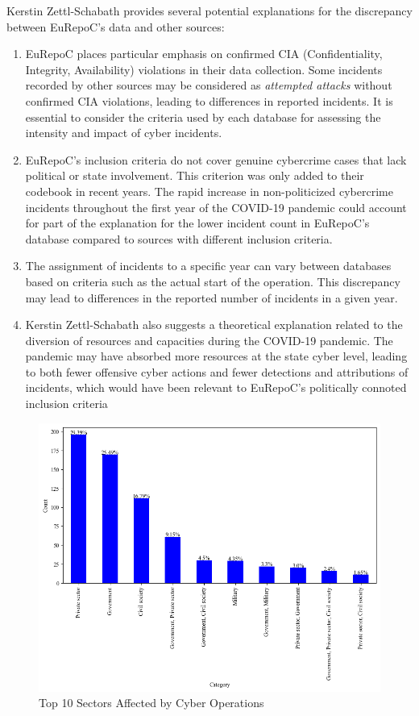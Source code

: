 Kerstin Zettl-Schabath provides several potential explanations for the discrepancy between EuRepoC's data and other sources:
\begin{enumerate}
    \item EuRepoC places particular emphasis on confirmed CIA (Confidentiality, Integrity, Availability) violations in their data collection. Some incidents recorded by other sources may be considered as \textit{attempted attacks} without confirmed CIA violations, leading to differences in reported incidents. It is essential to consider the criteria used by each database for assessing the intensity and impact of cyber incidents.
    \item EuRepoC's inclusion criteria do not cover genuine cybercrime cases that lack political or state involvement. This criterion was only added to their codebook in recent years. The rapid increase in non-politicized cybercrime incidents throughout the first year of the COVID-19 pandemic could account for part of the explanation for the lower incident count in EuRepoC's database compared to sources with different inclusion criteria.
    \item The assignment of incidents to a specific year can vary between databases based on criteria such as the actual start of the operation. This discrepancy may lead to differences in the reported number of incidents in a given year.
    \item Kerstin Zettl-Schabath also suggests a theoretical explanation related to the diversion of resources and capacities during the COVID-19 pandemic. The pandemic may have absorbed more resources at the state cyber level, leading to both fewer offensive cyber actions and fewer detections and attributions of incidents, which would have been relevant to EuRepoC's politically connoted inclusion criteria
\end{enumerate}

\begin{figure}[H]
    \centering
    \includegraphics[width=\textwidth]{Images/top10sect.png}
    \caption{Top 10 Sectors Affected by Cyber Operations}
    \label{fig:top10sect}
\end{figure}

